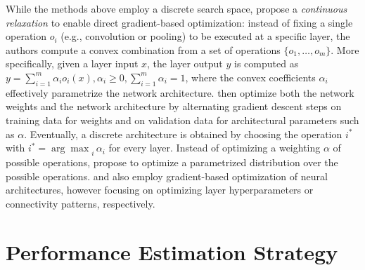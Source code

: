 \documentclass[twoside,11pt]{article}
\begin{document}
While the methods above employ a discrete search space, \citet{liu_darts} propose a \emph{continuous relaxation} to enable direct gradient-based optimization:
instead of fixing a single operation $o_i$ (e.g., convolution or pooling) to be executed at a specific layer, the authors compute a convex combination from a set of operations $\{o_1, \dots, o_m \}$. More specifically, given a layer input $x$, the layer output $y$ is computed as $y  = \sum_{i=1}^{m} \alpha_i o_i(x), \alpha_i \ge 0, \sum_{i=1}^m \alpha_i = 1 $, where the convex coefficients $\alpha_i$ effectively parametrize the network architecture. \citet{liu_darts} then optimize both the network weights and the network architecture by alternating gradient descent steps on training data for weights and on validation data for architectural parameters such as $\alpha$. Eventually, a discrete architecture is obtained by choosing the operation $i^*$ with $ i^* =  {\arg\max}_i \,  \alpha_i$ for every layer. Instead of optimizing a weighting $\alpha$ of possible operations, \citet{xie2018snas,cai2018proxylessnas} propose to optimize a parametrized distribution over the possible operations. \citet{shin2018differentiable} and \citet{ahmed_connect} also employ gradient-based optimization of neural architectures, however focusing on optimizing layer hyperparameters or connectivity patterns, respectively. %

\section{Performance Estimation Strategy}\label{Section:performance_estimation} %
\end{document}
